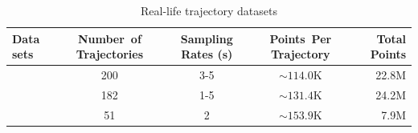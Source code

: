 \begin{table}[b!]
	\caption{\small Real-life trajectory datasets}
	\centering
	\footnotesize
	\begin{tabular}{|l|c|c|c|r|}
		\hline
		\bf{Data sets}& \bf{Number\ of Trajectories}     &\bf{Sampling Rates (s)}   &\bf{Points~Per Trajectory}    &\bf{Total Points} \\	\hline
		\ucar	&200	    &3-5	&$\sim114.0$K   &22.8M 	\\	\hline
		\geolife &182	    &1-5	&$\sim131.4$K   &24.2M	\\	\hline
		\mopsi   &51	    	&2	    &$\sim153.9$K   &7.9M	\\	\hline
	\end{tabular}
	\label{tab:datasets}
	\vspace{-2ex}
\end{table}






